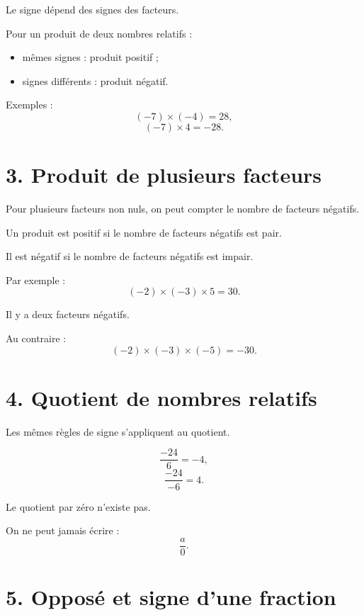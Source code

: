 Le signe dépend des signes des facteurs.


\begin{propriete}
Pour un produit de deux nombres relatifs :
\begin{itemize}
\item mêmes signes : produit positif ;
\item signes différents : produit négatif.
\end{itemize}
\end{propriete}

Exemples :
\[
(-7)\times(-4)=28,
\]
\[
(-7)\times4=-28.
\]

\section{3. Produit de plusieurs facteurs}

Pour plusieurs facteurs non nuls, on peut compter le nombre de facteurs négatifs.

\begin{propriete}
Un produit est positif si le nombre de facteurs négatifs est pair.

Il est négatif si le nombre de facteurs négatifs est impair.
\end{propriete}

Par exemple :
\[
(-2)\times(-3)\times5=30.
\]

Il y a deux facteurs négatifs.

Au contraire :
\[
(-2)\times(-3)\times(-5)=-30.
\]

\section{4. Quotient de nombres relatifs}

Les mêmes règles de signe s'appliquent au quotient.

\[
\dfrac{-24}{6}=-4,
\]
\[
\dfrac{-24}{-6}=4.
\]

\begin{attention}
Le quotient par zéro n'existe pas.
\end{attention}

On ne peut jamais écrire :
\[
\dfrac a0.
\]

\section{5. Opposé et signe d'une fraction}

